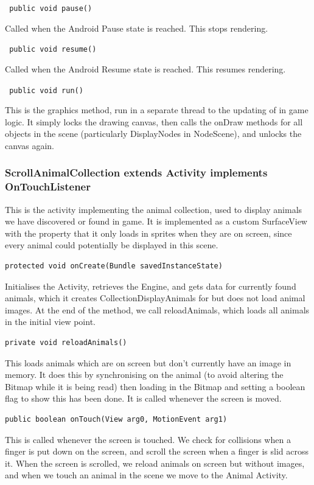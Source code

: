 \documentclass[12pt,a4paper,twoside]{article}
\begin{document}
\verb£ public void pause()£

Called when the Android Pause state is reached. This stops rendering.

\verb£ public void resume()£

Called when the Android Resume state is reached. This resumes rendering.

\verb£ public void run()£

This is the graphics method, run in a separate thread to the updating of in game logic. It simply locks the drawing canvas, then calls the onDraw methods for all objects in the scene (particularly DisplayNodes in NodeScene), and unlocks the canvas again.


\subsubsection{ScrollAnimalCollection extends Activity implements OnTouchListener}

This is the activity implementing the animal collection, used to display animals we have discovered or found in game. It is implemented as a custom SurfaceView with the property that it only loads in sprites when they are on screen, since every animal could potentially be displayed in this scene.

\begin{verbatim}
protected void onCreate(Bundle savedInstanceState)
\end{verbatim}

Initialises the Activity, retrieves the Engine, and gets data for currently found animals, which it creates CollectionDisplayAnimals for but does not load animal images. At the end of the method, we call reloadAnimals, which loads all animals in the initial view point. 

\begin{verbatim}
private void reloadAnimals()
\end{verbatim}
This loads animals which are on screen but don't currently have an image in memory. It does this by synchronising on the animal (to avoid altering the Bitmap while it is being read) then loading in the Bitmap and setting a boolean flag to show this has been done. It is called whenever the screen is moved.


\begin{verbatim}
public boolean onTouch(View arg0, MotionEvent arg1)
\end{verbatim}

This is called whenever the screen is touched. We check for collisions when a finger is put down on the screen, and scroll the screen when a finger is slid across it. When the screen is scrolled, we reload animals on screen but without images, and when we touch an animal in the scene we move to the Animal Activity.
\end{document}
